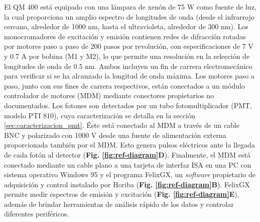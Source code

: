 El QM 400 está equipado con una lámpara de xenón de 75 W como fuente de luz, la cual proporciona un amplio espectro de longitudes de onda (desde el infrarrojo cercano, alrededor de 1000 nm, hasta el ultravioleta, alrededor de 300 nm).
Los monocromadores de excitación y emisión contienen redes de difracción rotadas por motores paso a paso de 200 pasos por revolución, con especificaciones de 7 V y 0.7 A por bobina (M1 y M2), lo que permite una resolución en la selección de longitudes de onda de 0.5 nm. 
Ambos incluyen un fin de carrera electromecánico para verificar si se ha alcanzado la longitud de onda máxima.
Los motores paso a paso, junto con sus fines de carrera respectivos, están conectados a un módulo controlador de motores (MDM) mediante conectores propietarios no documentados. 
Los fotones son detectados por un tubo fotomultiplicador (PMT, modelo PTI 810), cuya caracterización se detalla en la sección \ref{sec:caracterizacion_pmt}.
Éste está conectado al MDM a través de un cable BNC y polarizado con 1000 V desde una fuente de alimentación externa proporcionada también por el MDM. 
Esto genera pulsos eléctricos ante la llegada de cada fotón al detector (\textbf{Fig. \ref{fig:ref-diagram}D}). 
Finalmente, el MDM está conectado mediante un cable plano a una tarjeta de interfaz ISA en una PC con sistema operativo Windows 95 y el programa FelixGX, un \textit{software} propietario de adquisición y control instalado por Horiba (\textbf{Fig. \ref{fig:ref-diagram}B}).
FelixGX permite medir espectros de emisión y excitación (\textbf{Fig. \ref{fig:ref-diagram}E}), además de brindar herramientas de análisis rápido de los datos y controlar diferentes periféricos.

